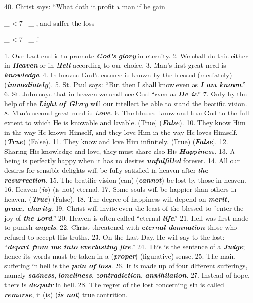 \documentclass[a4paper,14pt]{memoir}
\newcommand\answer[1]{\textbf{\textit{#1}}}
\newcounter{z}
\newcommand\spaces[1]{\rule{0pt}{18pt} \_\loop \ifnum\value{z} < #1
~\_%
\stepcounter{z}%
\repeat%
\setcounter{z}{0}}
\begin{document}
40. Christ says: “What doth it profit a man if he gain \spaces{7},  and
suffer the loss \spaces{7}.”


\newpage


1. Our Last end is to promote \answer{God's glory}  in  eternity.  
2.  We  shall  do  this
either in \answer{Heaven} or in \answer{Hell} according to our choice. 
3. Man's first  great
need is \answer{knowledge}.  
4.  In  heaven  God's  essence  is  known  by  the  blessed
(mediately) (\answer{immediately}). 
5. St. Paul says: “But then I shall know even  as
\answer{I am known}.” 
6. St. John says that in heaven we shall see God “even as  \answer{He is}.”
7. Only by the help of the \answer{Light of Glory} will our intellect be able  to  stand  the
beatific vision. 
8. Man's second great need is \answer{Love}. 
9. The  blessed  know
and love God to the full extent to which He is knowable and lovable.  (True)
(\answer{False}). 
10. They know Him in the way He knows Himself, and  they  love  Him
in the way He loves Himself. (\answer{True}) (False). 
11.  They  know  and  love  Him
infinitely. (True) (\answer{False}). 
12. Sharing His knowledge and  love,  they  must
share also His \answer{Happiness}. 
13. A  being  is  perfectly  happy  when  it  has  no
desires \answer{unfulfilled} forever. 
14. All our desires for sensible  delights  will  be
fully satisfied in heaven  after  \answer{the resurrection}.  
15.  The  beatific  vision  (can)
(\answer{cannot}) be lost by those in heaven. 
16. Heaven (\answer{is}) (is not)  eternal.  
17.
Some souls will be happier than others in heaven. (\answer{True})  (False).  
18.  The
degree of happiness will depend on \answer{merit, grace, charity}. 
19. Christ will invite  even  the
least of the blessed to “enter the joy  of  \answer{the Lord}.”  
20.  Heaven  is  often
called “eternal \answer{life}.” 
21. Hell was  first  made  to  punish  \answer{angels}.  
22.
Christ threatened with \answer{eternal damnation} those who refused to accept  His  truths.  
23.
On the Last Day, He will  say  to  the  lost:  “\answer{depart from me into everlasting fire}.”  
24.  This  is  the
sentence of  a  \answer{Judge};  hence  its  words  must  be  taken  in  a  (\answer{proper})
(figurative) sense. 
25. The main suffering in hell is the \answer{pain of loss}. 
26. It  is
made up of  four  different  sufferings,  namely  \answer{sadness},   \answer{loneliness},  \answer{contradiction},
\answer{annihilation}. 
27. Instead of hope, there is \answer{despair} in hell.  
28.  The  regret  of
the lost concerning sin is called \answer{remorse}, it (is) (\answer{is not}) true  contrition.
\end{document}
